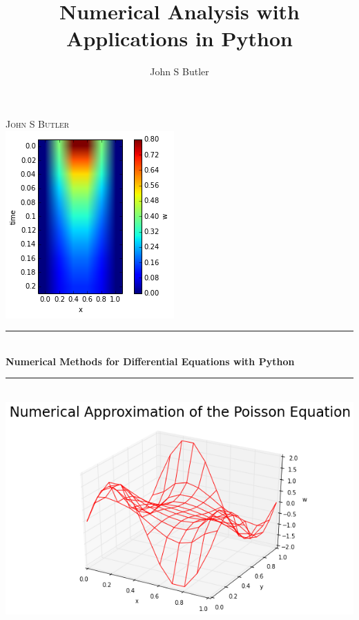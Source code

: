\documentclass[
  oneside,
  11pt, a4paper,
  footinclude=true,
  headinclude=true,
  cleardoublepage=empty
]{scrbook}
\title{Numerical Analysis with Applications in Python}
\author{John S Butler}
\date{}
\begin{document}
\begin{titlepage}
\newcommand{\HRule}{\rule{\linewidth}{0.5mm}}
\center
\textsc{\LARGE
John S Butler
} \\[1cm]
\includegraphics[scale=0.75]{HeatEquationFigures/Fully_implicit/r_equals_half/solution_plot_image.png} \\[1cm]
\HRule \\[0.4cm]
{ \huge \bfseries Numerical Methods for Differential Equations with Python\\[0.15cm] }
\HRule \\
\includegraphics[scale=0.6]{PoissonEqn/PoissonEqn_SineWave_BC.png} 

\end{titlepage}


%
%
%
%

\end{document}
